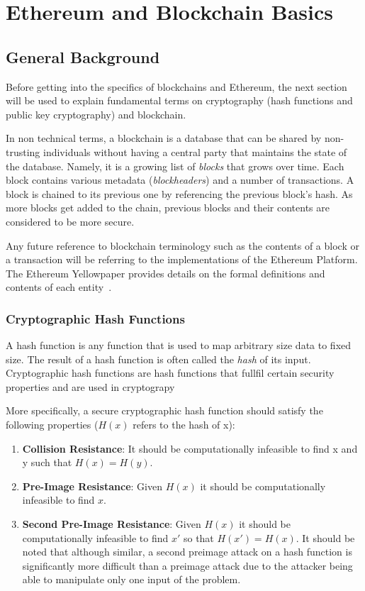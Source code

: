\chapter{Ethereum and Blockchain Basics}

\section{General Background}
Before getting into the specifics of blockchains and Ethereum, the next section will be used to explain fundamental terms on cryptography (hash functions and public key cryptography) and blockchain.

In non technical terms, a blockchain is a database that can be shared by non-trusting individuals without having a central party that maintains the state of the database. Namely, it is a growing list of \textit{blocks} that grows over time. Each block contains various metadata (\textit{blockheaders}) and a number of transactions. A block is chained to its previous one by referencing the previous block's hash. As more blocks get added to the chain, previous blocks and their contents are considered to be more secure.

Any future reference to blockchain terminology such as the contents of a block or a transaction will be referring to the implementations of the Ethereum Platform. The Ethereum Yellowpaper provides details on the formal definitions and contents of each entity~\cite{ethereum}.

\subsection{Cryptographic Hash Functions}
A hash function is any function that is used to map arbitrary size data to fixed size. The result of a hash function is often called the \textit{hash} of its input. Cryptographic hash functions are hash functions that fullfil certain security properties and are used in cryptograpy %

More specifically, a secure cryptographic hash function should satisfy the following properties (\(H(x)\) refers to the hash of x):
\begin{enumerate}
   \item \textbf{Collision Resistance}: It should be computationally infeasible to find x and y such that \(H(x) = H(y)\). 
   \item \textbf{Pre-Image Resistance}: Given \(H(x)\) it should be computationally infeasible to find \(x\).
   \item \textbf{Second Pre-Image Resistance}: Given \(H(x)\) it should be computationally infeasible to find \(x'\) so that \(H(x') = H(x)\). It should be noted that although similar, a second preimage attack on a hash function is significantly more difficult than a preimage attack due to the attacker being able to manipulate only one input of the problem. 
\end{enumerate}

